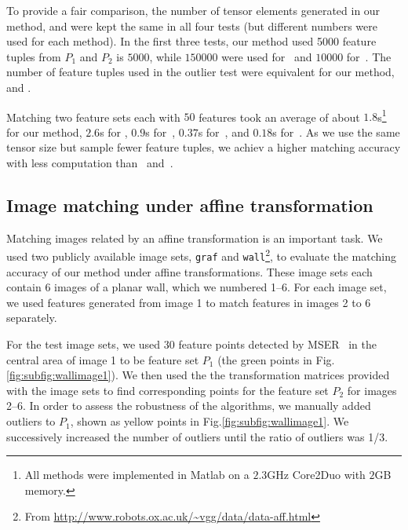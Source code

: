 To provide a fair comparison, the number of tensor elements generated in our method, \cite{Duchenne_etal09} and \cite{Zass08} were kept the same in all four tests (but different numbers were used for each method).
In the first three tests, our method used 5000 feature tuples from $P_1$ and $P_2$ is $5000$, while $150000$ were used for~\cite{Duchenne_etal09} and $10000$ for~\cite{Zass08}. The number of feature tuples used in the outlier test were equivalent for our method, \cite{Duchenne_etal09} and \cite{Zass08}.

Matching two feature sets each with $50$ features took an average of about $1.8$s\footnote{All methods were implemented in Matlab on a $2.3$GHz Core2Duo with $2$GB memory.} for our method, $2.6$s for \cite{Duchenne_etal09}, $0.9$s for~\cite{Zass08}, $0.37$s for~\cite{Cour06}, and $0.18$s for~\cite{Belongie02}. As we use the same tensor size but sample fewer feature tuples, we achiev a higher matching accuracy with less computation than~\cite{Duchenne_etal09} and~\cite{Zass08}.

\subsection{Image matching under affine transformation}
\label{subsec:affinedata}

Matching images related by an affine transformation is an important task. We used two publicly available image sets, \texttt{graf} and \texttt{wall}\footnote{From \url{http://www.robots.ox.ac.uk/~vgg/data/data-aff.html}}, to evaluate the matching accuracy of our method under affine transformations. These image sets each contain 6 images of a planar wall, which we numbered 1--6. For each image set, we used features generated from image 1 to match features in images 2 to 6 separately.

For the test image sets, we used $30$ feature points detected by MSER~\cite{Matas04} in the central area of image 1 to be feature set $P_1$ (the green points in Fig.\ref{fig:subfig:wallimage1}). We then used the the transformation matrices provided with the image sets to find corresponding points for the feature set $P_2$ for images 2--6.
In order to assess the robustness of the algorithms, we manually added outliers to $P_1$, shown as yellow points in Fig.\ref{fig:subfig:wallimage1}. We successively increased the number of outliers until the ratio of outliers was 1/3.

